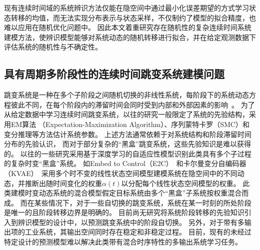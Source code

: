 现有连续时间域的系统辨识方法仅能在隐空间中通过最小化误差期望的方式学习状态转移的均值，而无法实现分布表示与状态采样，不仅制约了模型的拟合精度，也难以应用在随机优化问题中。
因此本文着重研究存在随机性的复杂连续时间系统建模方法，使辨识模型能够对系统动态的随机转移进行拟合，并在给定观测数据下评估系统的随机性与不确定性。

\subsection{具有周期多阶段性的连续时间跳变系统建模问题}
跳变系统是一种在多个子阶段之间随机切换的非线性系统，每阶段下的系统动态方程彼此不同，在每个阶段内的滞留时间会同时受到内部和外部因素的影响~\cite{WANG2022111790}。
为了从给定数据中学习连续时间跳变系统，以往的研究一般限定了系统的先验结构，采用EM算法 （Expectation-Maximization Algorithm）\cite{balenzuela2022parameter}、序列蒙特卡罗（SMC）\cite{6859280}和变分推理\cite{opper2007variational}等方法估计系统参数。
上述方法通常依赖于对系统结构和阶段滞留时间分布的先验认识，
而对于部分复杂的“黑盒”跳变系统，这些先验知识是难以获得的。
以往的一些研究采用基于深度学习的自适应性模型识别此类具有多个子过程的复杂时变“黑盒”系统。
如Embed to Control（E2C）~\cite{Watter2015}和卡尔曼变分自编码器（KVAE）~\cite{Fraccaro2017}采用多个时不变的线性状态空间模型建模系统在隐空间中的不同动态，并推断出随时间变化的权重$\alpha(t)$以分配每个线性状态空间模型的权重。
此类建模时变动态系统的混合模型假定目标系统由多个“黑盒”子系统按权重混合而成。
而在某些情况下，对于一些自切换的跳变系统，系统在某一时刻的所处阶段是唯一的且阶段转移边界是明确的。
目前尚无研究将系统阶段转移的先验知识引入到辨识模型的设计中，以预测跳变系统中的阶段自切换。  
另外，对于带有多输出项的工业系统，其输出空间同时存在稳定和非稳定过程\cite{nason2006stationary}。
目前，现有的未经过特定设计的预测模型难以解决此类带有混合时序特性的多输出系统学习任务。

